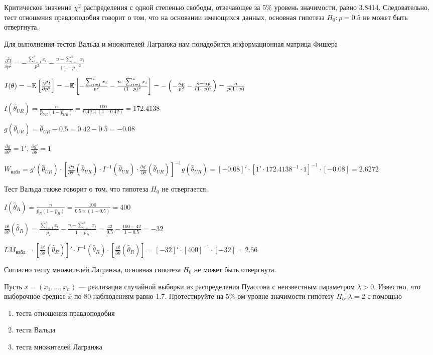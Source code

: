 \documentclass[pdftex,11pt,openany]{book}\usepackage[]{graphicx}\usepackage[]{color}
\begin{document}
\begin{solution}
Критическое значение $\chi^2$ распределения с одной степенью свободы, отвечающее за 5\% уровень значимости, равно 3.8414. Следовательно, тест отношения правдоподобия говорит о том, что на основании имеющихся данных, основная гипотеза $H_0: p = 0.5$ не может быть отвергнута.

Для выполнения тестов Вальда и множителей Лагранжа нам понадобится информационная матрица Фишера

$\frac{\partial^2 l}{\partial p^2} = - \frac{\sum_{i=1}^n x_i}{p^2} - \frac{n - \sum_{i=1}^n x_i}{(1 - p)^2}$

$I(\theta) = -\mathbb{E}\left[ \frac{\partial^2 l}{\partial p^2} \right] = -\mathbb{E} \left[ - \frac{\sum_{i=1}^n x_i}{p^2} - \frac{n - \sum_{i=1}^n x_i}{(1 - p)^2} \right] = -\left(-\frac{np}{p^2} - \frac{n - np}{(1-p)^2}\right) = \frac{n}{p(1-p)}$

$I(\hat{\theta}_{UR}) = \frac{n}{\hat{p}_{UR}(1-\hat{p}_{UR})} = \frac{100}{0.42 \times (1 - 0.42)} = 172.4138$

$g(\hat{\theta}_{UR}) = \hat{\theta}_{UR} - 0.5 = 0.42 - 0.5 = -0.08$

$\frac{\partial g}{\partial \theta'} = 1'$, $\frac{\partial g'}{\partial \theta} = 1$

$W_{\text{набл}} = g'(\hat{\theta}_{UR}) \cdot \left[ \frac{\partial g}{\partial \theta'}(\hat{\theta}_{UR}) \cdot I^{-1}(\hat{\theta}_{UR}) \cdot \frac{\partial g'}{\partial \theta}(\hat{\theta}_{UR}) \right]^{-1} g(\hat{\theta}_{UR}) = [-0.08]' \cdot [1' \cdot 172.4138^{-1} \cdot 1]^{-1} \cdot [-0.08] = 2.6272$

Тест Вальда также говорит о том, что гипотеза $H_0$ не отвергается.

$I(\hat{\theta}_{R}) = \frac{n}{\hat{p}_{R}(1-\hat{p}_{R})} = \frac{100}{0.5 \times (1 - 0.5)} = 400$

$\frac{\partial l}{\partial \theta}(\hat{\theta}_R) = \frac{\sum_{i=1}^n x_i}{\hat{p}_R} - \frac{n - \sum_{i=1}^n x_i}{1 - \hat{p}_R} = \frac{42}{0.5} - \frac{100 - 42}{1 - 0.5} = -32$

$LM_{\text{набл}} = \left[ \frac{\partial l}{\partial \theta}(\hat{\theta}_{R}) \right]' \cdot I^{-1}(\hat{\theta}_{R}) \cdot \left[ \frac{\partial l}{\partial \theta}(\hat{\theta}_{R}) \right] = [-32]' \cdot [400]^{-1} \cdot [-32] = 2.56$

Согласно тесту множителей Лагранжа, основная гипотеза $H_0$ не может быть отвергнута.
\end{solution}


\begin{problem}
Пусть $x = (x_1, \ldots, x_n)$ --- реализация случайной выборки из распределения Пуассона с неизвестным параметром $\lambda > 0$. Известно, что выборочное среднее $\overline{x}$ по 80 наблюдениям равно 1.7. Протестируйте на 5\%-ом уровне значимости гипотезу $H_0: \lambda = 2$ с помощью
\begin{enumerate}
\item теста отношения правдоподобия
\item теста Вальда
\item теста множителей Лагранжа
\end{enumerate}
\end{problem}
\end{document}
